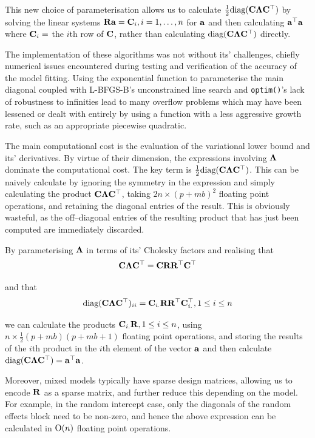 \noindent This new choice of parameterisation allows us to calculate $\frac{1}{2} \text{diag}({\bf C} {\boldsymbol \Lambda}
{\bf C}^\top)$ by solving the linear systems ${\bf R} {\bf a} = {\bf C}_{i}, i=1, \ldots, n$ for   ${\bf a}$ and then calculating
${\bf a}^\top{\bf a}$ where ${\bf C}_{i} = $ the $i$th row of ${\bf C}$, rather than calculating $\text{diag}({\bf C} {\boldsymbol \Lambda}
{\bf C}^\top)$ directly.
	
The implementation of these algorithms was not without its' challenges, chiefly numerical issues encountered during testing and verification of the accuracy of the model fitting. Using the exponential function to parameterise the main diagonal coupled with L-BFGS-B's unconstrained line search and \texttt{optim()}'s lack of robustness to infinities lead to many overflow problems which may have been lessened or dealt with entirely by using a function with a less aggressive growth rate, such as an appropriate piecewise quadratic.
	
The main computational cost is the evaluation of the variational lower bound and its' derivatives. By
virtue of their dimension, the expressions involving ${\boldsymbol \Lambda}$ dominate the computational cost. The key
term is $\frac{1}{2} \text{diag}({\bf C} {\boldsymbol \Lambda} {\bf C}^\top)$. This can be naively calculate by ignoring the
symmetry in the expression and simply calculating the product ${\bf C} {\boldsymbol \Lambda} {\bf C}^\top$, taking $2 n
\times (p + m b)^2$ floating point operations, and retaining the diagonal entries of the result. This is
obviously wasteful, as the off--diagonal entries of the resulting product that has just been computed
are immediately discarded.
	
By parameterising ${\boldsymbol \Lambda}$ in terms of its' Cholesky factors and realising that
\begin{equation*}
	{\bf C} {\boldsymbol\Lambda} {\bf C}^\top = {\bf C} {\bf R} {\bf R}^\top {\bf C}^\top
\end{equation*}
	
\noindent and that
\begin{equation*}
	\text{diag}({\bf C} {\boldsymbol \Lambda} {\bf C}^\top)_{ii} = {\bf C}_{i .} {\bf R} {\bf R}^\top {\bf C}_{i .}^\top, 1 \leq i \leq n
\end{equation*}
	
\noindent we can calculate the products ${\bf C}_{i .} {\bf R}, 1 \leq i \leq n$, using $n \times \frac{1}{2}(p + m
b)(p + m b   + 1)$ floating point operations, and storing the results of the $i$th product in the $i$th
element of the   vector ${\bf a}$ and then calculate $\text{diag}({\bf C} {\boldsymbol \Lambda} {\bf C}^\top) = {\bf a}^\top {\bf a}$.
	
Moreover, mixed models typically have sparse design matrices, allowing us to encode ${\bf R}$ as a sparse matrix, and	further reduce   this depending on the model. For example, in the random intercept case, only the diagonals of the random effects block need to be non-zero, and hence the above expression can be calculated in
$\text{O}(n)$ floating point operations.
	
